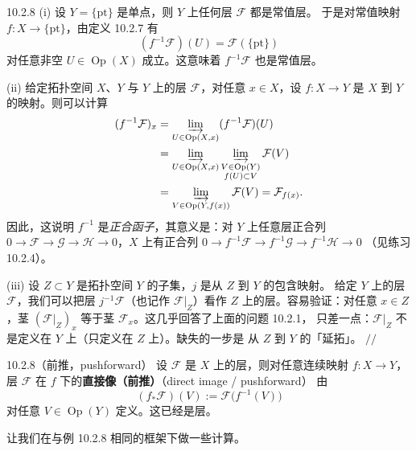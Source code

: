 \begin{wexam}{10.2.8}
  (i) 设 $Y=\{\mathrm{pt}\}$ 是单点，则 $Y$ 上任何层 $\mathcal{F}$ 都是常值层。
  于是对常值映射 $f\colon X\to\{\mathrm{pt}\}$，由定义 10.2.7 有
  \[
    (f^{-1}\mathcal{F})(U)=\mathcal{F}(\{\mathrm{pt}\})
  \]
  对任意非空 $U\in\operatorname{Op}(X)$ 成立。这意味着 $f^{-1}\mathcal{F}$ 也是常值层。

  (ii) 给定拓扑空间 $X$、$Y$ 与 $Y$ 上的层 $\mathcal{F}$，对任意 $x\in X$，设
  $f\colon X\to Y$ 是 $X$ 到 $Y$ 的映射。则可以计算
  \begin{align*}
    (f^{-1}\mathcal{F})_x
    &=\varinjlim_{U\in\operatorname{Op}(X,x)}(f^{-1}\mathcal{F})(U)\\
    &=\varinjlim_{U\in\operatorname{Op}(X,x)}
    \varinjlim_{\substack{V\in\operatorname{Op}(Y)\\ f(U)\subset V}}\mathcal{F}(V)\\
    &=\varinjlim_{V\in\operatorname{Op}(Y,f(x))}\mathcal{F}(V)=\mathcal{F}_{f(x)}.
  \end{align*}
  因此，这说明 $f^{-1}$ 是\emph{正合函子}，其意义是：对 $Y$ 上任意层正合列
  $0\to\mathcal{F}\to\mathcal{G}\to\mathcal{H}\to0$，$X$ 上有正合列
  $0\to f^{-1}\mathcal{F}\to f^{-1}\mathcal{G}\to f^{-1}\mathcal{H}\to0$
  （见练习 10.2.4）。

  (iii) 设 $Z\subset Y$ 是拓扑空间 $Y$ 的子集，$j$ 是从 $Z$ 到 $Y$ 的包含映射。
  给定 $Y$ 上的层 $\mathcal{F}$，我们可以把层 $j^{-1}\mathcal{F}$（也记作
  $\mathcal{F}|_Z$）看作 $Z$ 上的层。容易验证：对任意 $x\in Z$，茎
  $(\mathcal{F}|_Z)_x$ 等于茎 $\mathcal{F}_x$。这几乎回答了上面的问题 10.2.1，
  只差一点：$\mathcal{F}|_Z$ 不是定义在 $Y$ 上（只定义在 $Z$ 上）。缺失的一步是
  从 $Z$ 到 $Y$ 的「延拓」。
  \hfill$//$
\end{wexam}

\begin{wdefn}{10.2.8（前推，pushforward）}
  设 $\mathcal{F}$ 是 $X$ 上的层，则对任意连续映射 $f\colon X\to Y$，层
  $\mathcal{F}$ 在 $f$ 下的\textbf{直接像（前推）}（direct image / pushforward）
  由
  \[
    (f_\ast\mathcal{F})(V):=\mathcal{F}\bigl(f^{-1}(V)\bigr)
  \]
  对任意 $V\in\operatorname{Op}(Y)$ 定义。这已经是层。
\end{wdefn}

让我们在与例 10.2.8 相同的框架下做一些计算。

